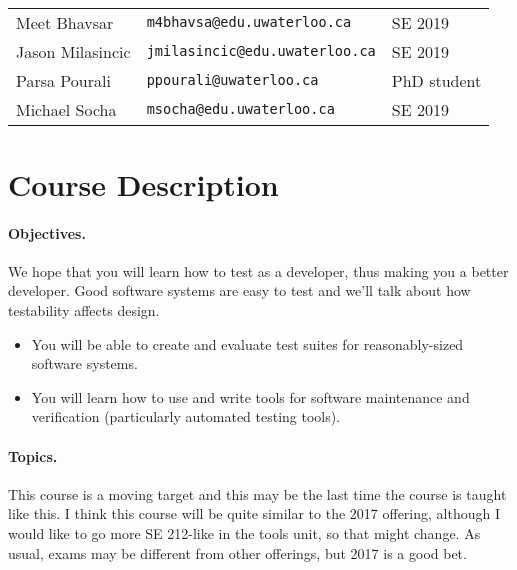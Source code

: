 \documentclass{article}
\begin{document}
 \\

\noindent
\hspace*{2em}\begin{tabular}{l@{\hspace*{3em}}ll}
  Meet Bhavsar &
  {\tt m4bhavsa@edu.uwaterloo.ca}&
  SE 2019 \\
  Jason Milasincic &
  {\tt jmilasincic@edu.uwaterloo.ca} &
  SE 2019 \\
  Parsa Pourali&
  {\tt ppourali@uwaterloo.ca}&
  PhD student\\
  Michael Socha &
  {\tt msocha@edu.uwaterloo.ca}&
  SE 2019
\end{tabular}

\section*{Course Description}
\paragraph{Objectives.}
We hope that you will learn how to test as a developer, thus making
you a better developer. Good software systems are easy to test and
we'll talk about how testability affects design.
\begin{itemize}
  \item You will be able to create and evaluate test suites for reasonably-sized
software systems.

  \item You will learn how to use and write tools for software maintenance and
verification (particularly automated testing tools).
\end{itemize}

\paragraph{Topics.}
This course is a moving target and this may be the last time the course
is taught like this. I think this course will be quite similar to the
2017 offering, although I would like to go more SE 212-like in the tools
unit, so that might change. As usual, exams may be different from other offerings,
but 2017 is a good bet.\\
\end{document}
